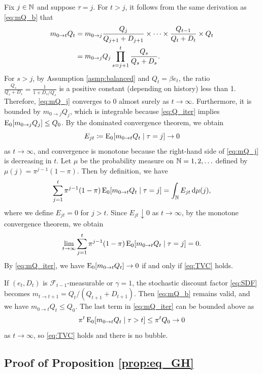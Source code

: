 \documentclass[a4paper,12pt]{article}
\newcommand{\F}{\mathcal{F}}
\numberwithin{equation}{section}
\theoremstyle{plain}
\begin{document}
Fix $j\in \mathbb{N}$ and suppose $\tau=j$. For $t>j$, it follows from the same derivation as \eqref{eq:mQ_b} that
\begin{align}
    m_{0\to t}Q_t&=m_{0\to j}\frac{Q_j}{Q_{j+1}+D_{j+1}}\times \dots \times \frac{Q_{t-1}}{Q_t+D_t}\times Q_t \notag \\
    &=m_{0\to j}Q_j\prod_{s=j+1}^t\frac{Q_s}{Q_s+D_s}. \label{eq:mQ_j}
\end{align}
For $s>j$, by Assumption \ref{asmp:balanced} and $Q_t=\beta e_t$, the ratio $\frac{Q_s}{Q_s+D_s}=\frac{1}{1+D_s/Q_s}$ is a positive constant (depending on history) less than 1. Therefore, \eqref{eq:mQ_j} converges to 0 almost surely as $t\to \infty$. Furthermore, it is bounded by $m_{0\to j}Q_j$, which is integrable because \eqref{eq:Q_iter} implies $\operatorname{E}_0[m_{0\to j}Q_j]\le Q_0$. By the dominated convergence theorem, we obtain
\begin{equation*}
    E_{jt}\coloneqq \operatorname{E}_0[m_{0\to t}Q_t \mid \tau=j]\to 0
\end{equation*}
as $t\to\infty$, and convergence is monotone because the right-hand side of \eqref{eq:mQ_j} is decreasing in $t$. Let $\mu$ be the probability measure on $\N=\set{1,2,\dotsc}$ defined by $\mu(j)=\pi^{j-1}(1-\pi)$. Then by definition, we have
\begin{equation*}
    \sum_{j=1}^t\pi^{j-1}(1-\pi)\operatorname{E}_0[m_{0\to t}Q_t \mid \tau=j]=\int_{\mathbb{N}} E_{jt}\mathop{}\!\mathrm{d} \mu(j),
\end{equation*}
where we define $E_{jt}=0$ for $j>t$. Since $E_{jt}\downarrow 0$ as $t\to \infty$, by the monotone convergence theorem, we obtain
\begin{equation*}
    \lim_{t\to\infty}\sum_{j=1}^t\pi^{j-1}(1-\pi)\operatorname{E}_0[m_{0\to t}Q_t \mid \tau=j]=0.
\end{equation*}
By \eqref{eq:mQ_iter}, we have $\operatorname{E}_0[m_{0\to t}Q_t]\to 0$ if and only if \eqref{eq:TVC} holds. 

If $(e_t,D_t)$ is $\F_{t-1}$-measurable or $\gamma=1$, the stochastic discount factor \eqref{eq:SDF} becomes $m_{t\to t+1}=Q_t/(Q_{t+1}+D_{t+1})$. Then \eqref{eq:mQ_b} remains valid, and we have $m_{0\to t}Q_t\le Q_0$. The last term in \eqref{eq:mQ_iter} can be bounded above as
\begin{equation*}
    \pi^t\operatorname{E}_0[m_{0\to t}Q_t \mid \tau>t]\le \pi^t Q_0\to 0
\end{equation*}
as $t\to \infty$, so \eqref{eq:TVC} holds and there is no bubble. \hfill \qedsymbol

\subsection{Proof of Proposition \ref{prop:eq_GH}}
\end{document}
